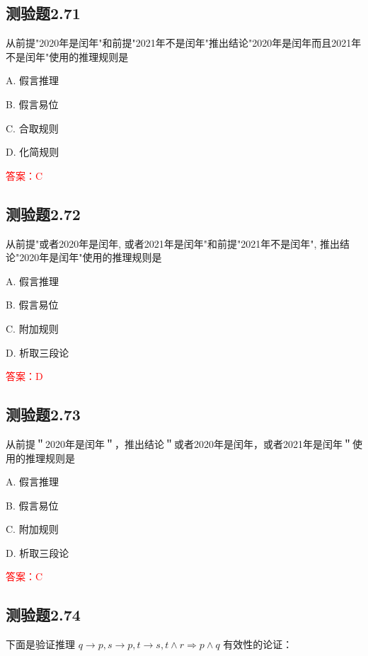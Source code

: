 \documentclass[UTF8, heading=true]{ctexart}
\begin{document}
\subsection{测验题2.71}

从前提"2020年是闰年"和前提"2021年不是闰年"推出结论"2020年是闰年而且2021年不是闰年"使用的推理规则是

A. 假言推理

B. 假言易位

C. 合取规则

D. 化简规则

\textcolor{red}{答案：C}

\subsection{测验题2.72}

从前提"或者2020年是闰年, 或者2021年是闰年"和前提"2021年不是闰年", 推出结论"2020年是闰年"使用的推理规则是

A. 假言推理

B. 假言易位

C. 附加规则

D. 析取三段论

\textcolor{red}{答案：D}

\subsection{测验题2.73}

从前提＂2020年是闰年＂，推出结论＂或者2020年是闰年，或者2021年是闰年＂使用的推理规则是 $\qquad$

A. 
假言推理

B. 
假言易位

C. 
附加规则

D. 
析取三段论

\textcolor{red}{答案：C}

\subsection{测验题2.74}

下面是验证推理 $q \rightarrow p, s \rightarrow p, t \rightarrow s, t \wedge r \Longrightarrow p \wedge q$ 有效性的论证：

\clearpage
\end{document}
